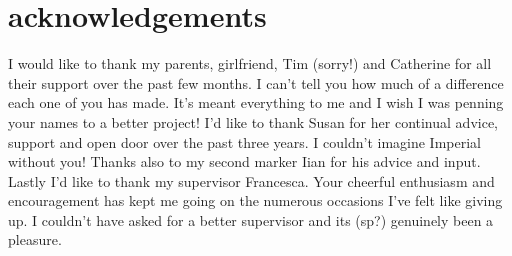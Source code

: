 \chapter*{acknowledgements}
	I would like to thank my parents, girlfriend, Tim (sorry!) and Catherine for all their support over the past few months. I can't tell you how much of a difference each one of you has made. It's meant everything to me and I wish I was penning your names to a better project! I'd like to thank Susan for her continual advice, support and open door over the past three years. I couldn't imagine Imperial without you! Thanks also to my second marker Iian for his advice and input. Lastly I'd like to thank my supervisor Francesca. Your cheerful enthusiasm and encouragement has kept me going on the numerous occasions I've felt like giving up. I couldn't have asked for a better supervisor and its (sp?) genuinely been a pleasure.